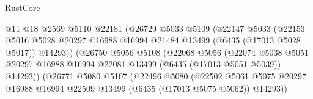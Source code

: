 \begin{lexlean}{RustCore}
\begin{coremodule}
                                      @11
                                      @18
                                      @2569
                                      @5110
                                      @22181
                                      (@26729
                                        @5033
                                        @5109
                                        (@22147
                                          @5033
                                          (@22153
                                            @5016
                                            @5028
                                            @20297
                                            @16988
                                            @16994
                                            @21484
                                            @13499
                                            (@6435 (@17013 @5028 @5017))
                                            @14293))
                                        (@26750
                                          @5056
                                          @5108
                                          (@22068
                                            @5056
                                            (@22074
                                              @5038
                                              @5051
                                              @20297
                                              @16988
                                              @16994
                                              @22081
                                              @13499
                                              (@6435 (@17013 @5051 @5039))
                                              @14293))
                                          (@26771
                                            @5080
                                            @5107
                                            (@22496
                                              @5080
                                              (@22502
                                                @5061
                                                @5075
                                                @20297
                                                @16988
                                                @16994
                                                @22509
                                                @13499
                                                (@6435 (@17013 @5075 @5062))
                                                @14293))

\end{coremodule}
\end{lexlean}
